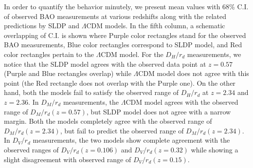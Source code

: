 \documentclass[11pt,a4paper]{article}
\begin{document}
In order to quantify the behavior minutely, we present mean values with 68\% C.I. of observed BAO measurements at various redshifts along with the  related predictions by SLDP and $\Lambda$CDM models. In the fifth column, a schematic overlapping of C.I. is shown where Purple color rectangles stand for the observed BAO measurements, Blue color rectangles correspond to SLDP model, and Red color rectangles pertain to the $\Lambda$CDM model. For the $D_H/r_d$ measurements, we notice that the SLDP model agrees with the observed data point at $z=0.57$ (Purple and Blue rectangles overlap) while $\Lambda$CDM model does not agree with this point (the Red rectangle does not overlap with the Purple one). On the other hand, both the models fail to satisfy the observed range of $D_H/r_d$ at $z=2.34$ and $z=2.36$. In $D_M/r_d$ measurements, the $\Lambda$CDM model agrees with the observed range of $D_M/r_d(z=0.57)$, but SLDP model does not agree with a narrow margin. Both the models completely agree with the observed range of $D_M/r_d(z=2.34)$, but fail to predict the observed range of $D_M/r_d(z=2.34)$. In $D_V/r_d$ measurements, the two models show complete agreement with the observed ranges of $D_V/r_d(z=0.106)$  and $D_V/r_d(z=0.32)$ while showing a slight disagreement with  observed range of $D_V/r_d(z=0.15)$.
\end{document}
